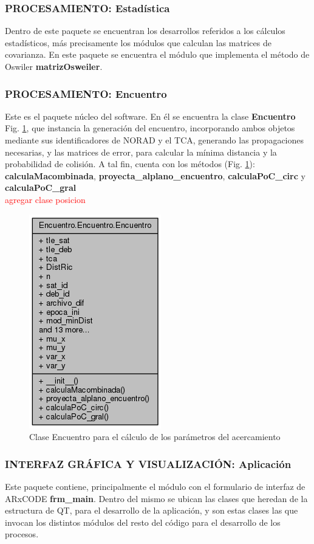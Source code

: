 \subsubsection*{PROCESAMIENTO: Estad\'istica}
Dentro de este paquete se encuentran los desarrollos referidos a los c\'alculos estad\'isticos, m\'as precisamente los m\'odulos que calculan las matrices de covarianza. En este paquete se encuentra el m\'odulo que implementa el m\'etodo de Oswiler {\bf{matrizOsweiler}}.

\subsubsection*{PROCESAMIENTO: Encuentro}
Este es el paquete n\'ucleo del software. En \'el se encuentra la clase {\bf{Encuentro}}  Fig. \ref{fig:claseencuentro}, que instancia la generaci\'on del encuentro, incorporando ambos objetos mediante sus identificadores de NORAD y el TCA, generando las propagaciones necesarias, y las matrices de error, para calcular la m\'inima distancia y la probabilidad de colisi\'on. A tal fin, cuenta con los m\'etodos (Fig. \ref{fig:claseencuentro}): {\bf{calculaMacombinada}}, {\bf{proyecta\_alplano\_encuentro}}, {\bf{calculaPoC\_circ}} y  {\bf{calculaPoC\_gral}}\\
\textcolor{red}{agregar clase posicion}

\begin{figure}[h!]
  \centering
  \includegraphics[width=.3\textwidth]{imagenes/encuentroClass} 
  \caption[Clase Encuentro]{Clase Encuentro para el c\'alculo de los par\'ametros del acercamiento}
  \label{fig:claseencuentro}
\end{figure}


\subsubsection*{INTERFAZ GR\'AFICA Y VISUALIZACI\'ON: Aplicaci\'on}
Este paquete contiene, principalmente el m\'odulo con el formulario de interfaz de ARxCODE {\bf{frm\_main}}. Dentro del mismo se ubican las clases que heredan de la estructura de QT, para el desarrollo de la aplicaci\'on, y son estas clases las que invocan los distintos m\'odulos del resto del c\'odigo para el desarrollo de los procesos.\\

